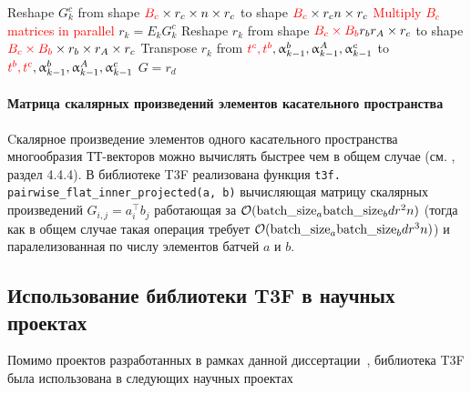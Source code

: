 \begin{algorithm}[tb]
\begin{algorithmic}[1]
   \STATE Reshape $G_k^c$ from shape $\textcolor{red}{B_c} \times r_c \times n \times r_c$ to shape $\textcolor{red}{B_c} \times r_c n \times r_c$
   \STATE \textcolor{red}{Multiply $B_c$ matrices in parallel} $r_k = E_k G_k^c$ 
   \STATE Reshape $r_k$ from shape $\textcolor{red}{B_c \times B_b} r_b r_A \times r_c$ to shape $\textcolor{red}{B_c \times B_b} \times r_b \times r_A \times r_c$
   \STATE Transpose $r_k$ from $\textcolor{red}{t^c, t^b}, \alpha_{k-1}^b,\alpha_{k-1}^A, \alpha_{k-1}^c$ to $\textcolor{red}{t^b, t^c}, \alpha_{k-1}^b,\alpha_{k-1}^A, \alpha_{k-1}^c$ 
   \ENDFOR
   \STATE $G = r_d$
\end{algorithmic}
\end{algorithm}

\paragraph{Матрица скалярных произведений элементов касательного пространства}
Cкалярное произведение элементов одного касательного пространства многообразия ТТ-векторов можно вычислять быстрее чем в общем случае (см. \cite{Steinlechner2016}, раздел 4.4.4). В библиотеке T3F реализована функция \texttt{t3f. pairwise\_flat\_inner\_projected(a, b)} вычисляющая матрицу скалярных произведений $G_{i,j} = a_i^\intercal b_j$ работающая за $\compl(\text{batch\_size}_a \text{batch\_size}_b d r^2 n)$  (тогда как в общем случае такая операция требует $\compl(\text{batch\_size}_a \text{batch\_size}_b d r^3 n)$) и паралелизованная по числу элементов батчей $a$ и $b$.


\subsection{Использование библиотеки T3F в научных проектах}
Помимо проектов разработанных в рамках данной диссертации~\cite{tensor-net?,mrf?,exp machines?,quantum}, библиотека T3F была использована в следующих научных проектах

